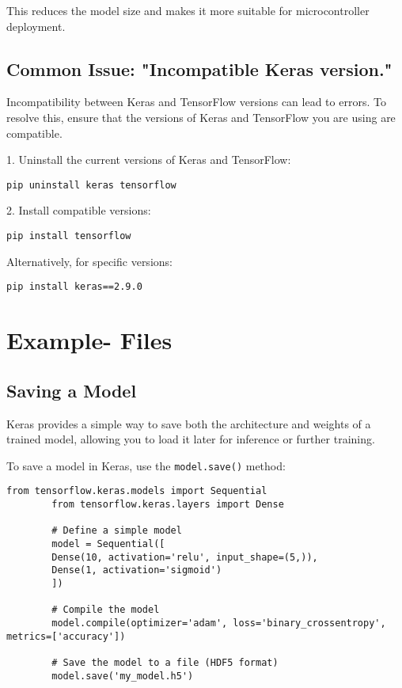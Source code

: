 	This reduces the model size and makes it more suitable for microcontroller deployment.
	
	\subsection{Common Issue: "Incompatible Keras version."}
	Incompatibility between Keras and TensorFlow versions can lead to errors. To resolve this, ensure that the versions of Keras and TensorFlow you are using are compatible.
	
	1. Uninstall the current versions of Keras and TensorFlow:
	
	\begin{lstlisting}[caption={Uninstall Keras and TensorFlow}, label={code:uninstall-tensorflow}, style=pythonstyle]
		pip uninstall keras tensorflow
	\end{lstlisting}
	
	2. Install compatible versions:
	
	\begin{lstlisting}[caption={Install Compatible Versions}, label={code:install-tensorflow}, style=pythonstyle]
		pip install tensorflow
	\end{lstlisting}
	
	Alternatively, for specific versions:
	
	\begin{lstlisting}[caption={Install Specific Version of Keras}, label={code:install-keras}, style=pythonstyle]
		pip install keras==2.9.0
	\end{lstlisting}
	
	\section{Example- Files}
	
	\subsection{Saving a Model}
	Keras provides a simple way to save both the architecture and weights of a trained model, allowing you to load it later for inference or further training.
	
	To save a model in Keras, use the \texttt{model.save()} method:
	
	\begin{lstlisting}[caption={Saving a Keras Model}, label={code:save-model}, style=pythonstyle]
		from tensorflow.keras.models import Sequential
		from tensorflow.keras.layers import Dense
		
		# Define a simple model
		model = Sequential([
		Dense(10, activation='relu', input_shape=(5,)),
		Dense(1, activation='sigmoid')
		])
		
		# Compile the model
		model.compile(optimizer='adam', loss='binary_crossentropy', metrics=['accuracy'])
		
		# Save the model to a file (HDF5 format)
		model.save('my_model.h5')
	\end{lstlisting}
	
